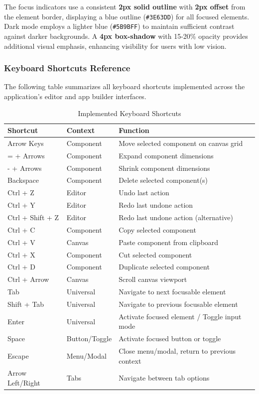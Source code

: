 The focus indicators use a consistent \textbf{2px solid outline} with \textbf{2px offset} from the element border, displaying a blue outline (\texttt{\#3E63DD}) for all focused elements. Dark mode employs a lighter blue (\texttt{\#5B9BFF}) to maintain sufficient contrast against darker backgrounds. A \textbf{4px box-shadow} with 15-20\% opacity provides additional visual emphasis, enhancing visibility for users with low vision.

\subsubsection{Keyboard Shortcuts Reference}

The following table summarizes all keyboard shortcuts implemented across the application's editor and app builder interfaces.

\begin{table}[h]
\centering
\caption{Implemented Keyboard Shortcuts}
\label{tab:keyboard-shortcuts}
\begin{tabular}{|l|l|p{6cm}|}
\hline
\textbf{Shortcut} & \textbf{Context} & \textbf{Function} \\
\hline
Arrow Keys & Component & Move selected component on canvas grid \\
\hline
= + Arrows & Component & Expand component dimensions \\
\hline
- + Arrows & Component & Shrink component dimensions \\
\hline
Backspace & Component & Delete selected component(s) \\
\hline
Ctrl + Z & Editor & Undo last action \\
\hline
Ctrl + Y & Editor & Redo last undone action \\
\hline
Ctrl + Shift + Z & Editor & Redo last undone action (alternative) \\
\hline
Ctrl + C & Component & Copy selected component \\
\hline
Ctrl + V & Canvas & Paste component from clipboard \\
\hline
Ctrl + X & Component & Cut selected component \\
\hline
Ctrl + D & Component & Duplicate selected component \\
\hline
Ctrl + Arrow & Canvas & Scroll canvas viewport \\
\hline
Tab & Universal & Navigate to next focusable element \\
\hline
Shift + Tab & Universal & Navigate to previous focusable element \\
\hline
Enter & Universal & Activate focused element / Toggle input mode \\
\hline
Space & Button/Toggle & Activate focused button or toggle \\
\hline
Escape & Menu/Modal & Close menu/modal, return to previous context \\
\hline
Arrow Left/Right & Tabs & Navigate between tab options \\
\hline
\end{tabular}
\end{table}

